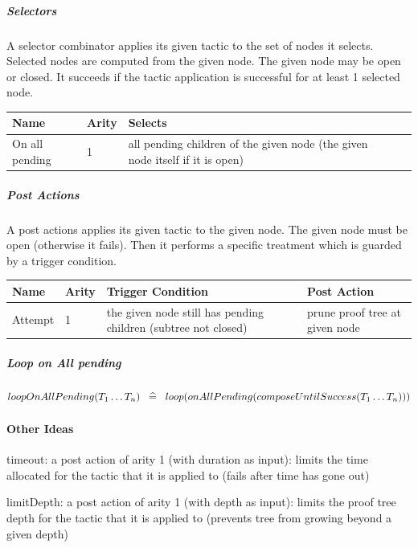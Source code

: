 \subparagraph{Selectors}

A selector combinator applies its given tactic to the set of nodes it selects. Selected nodes are computed from the given node. The given node may be open or closed. It succeeds if the tactic application is successful for at least 1 selected node. 

\begin{center}
    \begin{tabular}{ | l | l | l | p{5cm} |}
    \hline
	Name & Arity & Selects \\ \hline
	On all pending  & 1 & all pending children of the given node (the given node itself if it is open) \\ \hline
    \end{tabular}
\end{center}

\subparagraph{Post Actions}

A post actions applies its given tactic to the given node. The given node must be open (otherwise it fails). Then it performs a specific treatment which is guarded by a trigger condition. 

\begin{center}
    \begin{tabular}{ | p{} | p{1cm} | p{6cm} | p{5cm} |}
    \hline
	Name & Arity & Trigger Condition & Post Action \\ \hline
	Attempt & 1 & the given node still has pending children (subtree not closed) & prune proof tree at given node  \\ \hline
    \end{tabular}
\end{center}

\subparagraph{Loop on All pending}
\[loopOnAllPending(T_1 \ldots T_n) \;\;\mathrel{\widehat=}\;\; loop(onAllPending(composeUntilSuccess(T_1 \ldots T_n)))\]

\paragraph{Other Ideas}

    timeout: a post action of arity 1 (with duration as input): limits the time allocated for the tactic that it is applied to (fails after time has gone out)

    limitDepth: a post action of arity 1 (with depth as input): limits the proof tree depth for the tactic that it is applied to (prevents tree from growing beyond a given depth)

